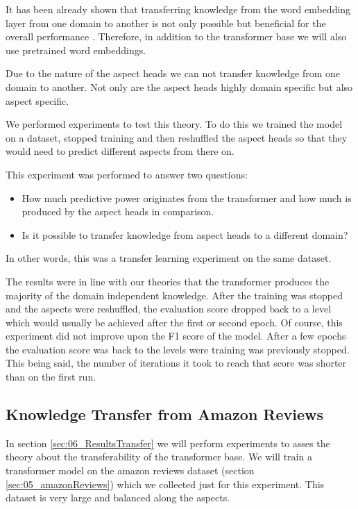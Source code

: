 It has been already shown that transferring knowledge from the word embedding layer from one domain to another is not only possible but beneficial for the overall performance \cite{Yosinski2014}. Therefore, in addition to the transformer base we will also use pretrained word embeddings.
\medskip

Due to the nature of the aspect heads we can not transfer knowledge from one domain to another. Not only are the aspect heads highly domain specific but also aspect specific. 
\smallskip

We performed experiments to test this theory. To do this we trained the model on a dataset, stopped training and then reshuffled the aspect heads so that they would need to predict different aspects from there on. 

This experiment was performed to answer two questions: 

\begin{itemize}
	\item How much predictive power originates from the transformer and how much is produced by the aspect heads in comparison.
	\item Is it possible to transfer knowledge from aspect heads to a different domain?
\end{itemize}

In other words, this was a transfer learning experiment on the same dataset.

The results were in line with our theories that the transformer produces the majority of the domain independent knowledge. After the training was stopped and the aspects were reshuffled, the evaluation score dropped back to a level which would usually be achieved after the first or second epoch. Of course, this experiment did not improve upon the F1 score of the model. After a few epochs the evaluation score was back to the levels were training was previously stopped. This being said, the number of iterations it took to reach that score was shorter than on the first run.
\medskip

\subsection{Knowledge Transfer from Amazon Reviews}

In section \ref{sec:06_ResultsTransfer} we will perform experiments to asses the theory about the transferability of the transformer base. We will train a transformer model on the amazon reviews dataset {(section \ref{sec:05_amazonReviews})} which we collected just for this experiment. This dataset is very large and balanced along the aspects.
\medskip

